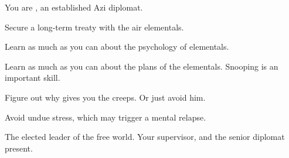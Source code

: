 \documentclass[char]{elementals}
\begin{document}
\name{\cDiplomat{}}

You are \cDiplomat{\intro}, an established Azi diplomat.

\begin{itemz}[Goals]
	\item  Secure a long-term treaty with the air elementals.
	\item  Learn as much as you can about the psychology of elementals.
	\item  Learn as much as you can about the plans of the elementals.  Snooping is an important skill.
	\item  Figure out why \cMS{} gives you the creeps.  Or just avoid him.
	\item  Avoid undue stress, which may trigger a mental relapse.
\end{itemz}

\begin{contacts}
	\contact{\Leader{}}  The elected leader of the free world.
	\contact{\cAvatar{}}  Your supervisor, and the senior diplomat present.
\end{contacts}
\end{document}
